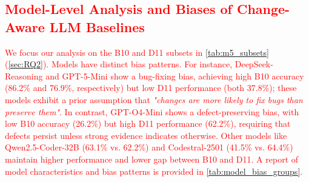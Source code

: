 \documentclass[authoryear,final,5p,times,twocolumn]{elsarticle}
\theoremstyle{plain}
\begin{document}
\subsection{\textcolor{red}{Model-Level Analysis and Biases of Change-Aware LLM Baselines}}
\label{sec:discussion_model_biases}
\textcolor{red}{
We focus our analysis on the B10 and D11 subsets in \autoref{tab:m5_subsets} (\autoref{sec:RQ2}). Models have distinct bias patterns. For instance, DeepSeek-Reasoning and GPT-5-Mini show a bug-fixing bias, achieving high B10 accuracy (86.2\% and 76.9\%, respectively) but low D11 performance (both 37.8\%); these models exhibit a prior assumption that \textit{"changes are more likely to fix bugs than preserve them"}. In contrast, GPT-O4-Mini shows a defect-preserving bias, with low B10 accuracy (26.2\%) but high D11 performance (62.2\%), requiring that defects persist unless strong evidence indicates otherwise. Other models like Qwen2.5-Coder-32B (63.1\% vs. 62.2\%) and Codestral-2501 (41.5\% vs. 64.4\%)  maintain higher performance and lower gap between B10 and D11. A report of model characteristics and bias patterns is provided in \autoref{tab:model_bias_groups}.}
\end{document}
